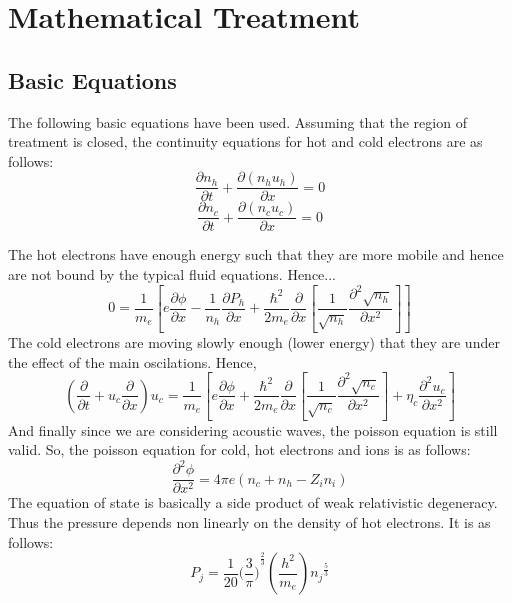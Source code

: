 \documentclass[a4paper, 12pt]{article}
\begin{document}
\section{Mathematical Treatment}
\label{maths}
\subsection{Basic Equations}
\label{basic}
The following basic equations have been used.
Assuming that the region of treatment is closed, the continuity equations for hot and cold electrons are as follows:
\newline
\begin{equation}
    \frac{\partial n_h}{\partial t} + \frac{\partial (n_h u_h)}{\partial x} = 0
\end{equation}
\begin{equation}
    \frac{\partial n_c}{\partial t} + \frac{\partial (n_c u_c)}{\partial x} = 0 
\end{equation}

The hot electrons have enough energy such that they are more mobile and hence are not bound by the typical fluid equations. Hence...
\newline
\begin{equation}
     0 = \frac{1}{m_e} [e \frac{\partial \phi}{\partial x} - \frac{1}{n_h}\frac{\partial P_h}{\partial x} + \frac{\hbar^2}{2m_e}\frac{\partial}{\partial x}[\frac{1}{\sqrt{n_h}}\frac{\partial^2 \sqrt{n_h}}{\partial x^2}]] 
\end{equation}
\newline
The cold electrons are moving slowly enough (lower energy) that they are under the effect of the main oscilations. Hence,
\newline
\begin{equation}
    (\frac{\partial}{\partial t} + u_c \frac{\partial}{\partial x})u_c = \frac{1}{m_e}[e\frac{\partial \phi}{\partial x} + \frac{\hbar^2}{2m_e}\frac{\partial}{\partial x}
    [\frac{1}{\sqrt{n_c}}\frac{\partial^2 \sqrt{n_c}}{\partial x^2}] + \eta_c \frac{\partial^2 u_c}{\partial x^2}]
\end{equation}
\newline
And finally since we are considering acoustic waves, the poisson equation is still valid. So, the poisson equation for cold, hot electrons and ions is as follows:
\newline
\begin{equation}
    \frac{\partial^2 \phi}{\partial x^2} = 4\pi e (n_c + n_h - Z_i n_i) 
\end{equation}
\newline
The equation of state is basically a side product of weak relativistic degeneracy. Thus the pressure depends non linearly on the density of hot electrons.
It is as follows:
\newline
\begin{equation}
  P_j = \frac{1}{20}{{(\frac{3}{\pi}})}^{\frac{2}{3}} (\frac{h^2}{m_e}) {n_j}^{\frac{5}{3}}
\end{equation}
\end{document}
